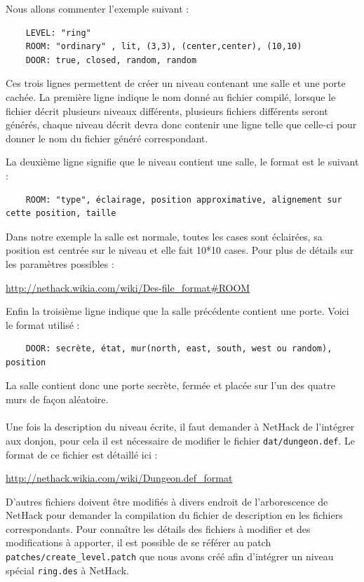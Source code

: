 \documentclass[10pt,a4paper]{report}
\begin{document}
Nous allons commenter l'exemple suivant :
\begin{verbatim}
    LEVEL: "ring"
    ROOM: "ordinary" , lit, (3,3), (center,center), (10,10)
    DOOR: true, closed, random, random
\end{verbatim}

Ces trois lignes permettent de créer un niveau contenant une salle et une
porte cachée. La première ligne indique le nom donné au fichier compilé,
lorsque le fichier décrit plusieurs niveaux différents, plusieurs fichiers
différents seront générés, chaque niveau décrit devra donc contenir une ligne
telle que celle-ci pour donner le nom du fichier généré correspondant.

La deuxième ligne signifie que le niveau contient une salle, le format est le
suivant :

\begin{verbatim}
    ROOM: "type", éclairage, position approximative, alignement sur cette position, taille
\end{verbatim}

Dans notre exemple la salle est normale, toutes les cases sont éclairées, sa
position est centrée sur le niveau et elle fait 10*10 cases. Pour plus de
détails sur les paramètres possibles : 

\url{http://nethack.wikia.com/wiki/Des-file_format#ROOM}

Enfin la troisième ligne indique que la salle précédente contient une porte.
Voici le format utilisé :

\begin{verbatim}
    DOOR: secrète, état, mur(north, east, south, west ou random), position
\end{verbatim}

La salle contient donc une porte secrète, fermée et placée sur l'un des quatre
murs de façon aléatoire.

\paragraph{}
Une fois la description du niveau écrite, il faut demander à NetHack de
l'intégrer aux donjon, pour cela il est nécessaire de modifier le fichier
\verb!dat/dungeon.def!. Le format de ce fichier est détaillé ici :

\url{http://nethack.wikia.com/wiki/Dungeon.def_format}

D'autres fichiers doivent être modifiés à divers endroit de l'arborescence de
NetHack pour demander la compilation du fichier de description en les fichiers
correspondants.
Pour connaître les détails des fichiers à modifier et des modifications à
apporter, il est possible de se référer au patch
\verb!patches/create_level.patch! que nous avons créé afin d'intégrer un
niveau spécial \verb!ring.des! à NetHack.
\end{document}
